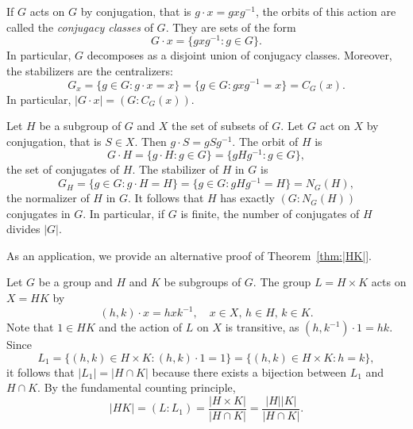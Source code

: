\begin{example}
    If $G$ acts on $G$ by conjugation, that is $g\cdot x=gxg^{-1}$, the orbits of this action are called the \emph{conjugacy classes} 
    of $G$. They are sets of the form
        \[
        G\cdot x=\{gxg^{-1}:g\in G\}.
        \]
    In particular, $G$ decomposes as a disjoint union of conjugacy classes. Moreover, 
    the stabilizers are the centralizers:
        \[
        G_x=\{g\in G:g\cdot x=x\}=\{g\in G:gxg^{-1}=x\}=C_G(x).
        \]
    In particular, $|G\cdot x|=(G:C_G(x))$.
\end{example}

\begin{example}
    Let $H$ be a subgroup of $G$ and $X$ the set of subsets of $G$. Let $G$ act on 
    $X$ by conjugation, that is $S\in X$. Then
        $g\cdot S=gSg^{-1}$. The orbit of $H$ 
        is 
        \[
        G\cdot H=\{g\cdot H:g\in G\}=\{gHg^{-1}:g\in G\},
        \]
        the set of conjugates of $H$. The stabilizer of $H$ in $G$ 
        is 
        \[
        G_H=\{g\in G:g\cdot H=H\}=\{g\in G:gHg^{-1}=H\}=N_G(H),
        \]
        the normalizer of $H$ in $G$. It follows that
        $H$ has exactly $(G:N_G(H))$ conjugates in $G$. In particular,
        if $G$ is finite, 
        the number of conjugates of $H$ divides $|G|$. 
\end{example}

As an application, we provide an alternative proof
of Theorem~\ref{thm:|HK|}. 

\begin{example}
\label{exa:for_HK}
Let $G$ be a group and $H$ and $K$ be subgroups of $G$. 
The group $L=H\times K$ acts on $X=HK$ by 
\[
(h,k)\cdot x=hxk^{-1},\quad x\in X,\,h\in H,\,k\in K.
\]
Note that $1\in HK$ and the action of $L$ on $X$ is transitive, as 
$(h,k^{-1})\cdot 1 = hk$. Since 
\[
L_1=\{(h,k)\in H\times K: (h,k)\cdot 1=1\}=\{(h,k)\in H\times K:h=k\},
\]
it follows that $|L_1|=|H\cap K|$ because there exists a bijection
between $L_1$ and 
$H\cap K$. By the fundamental counting principle, 
\[
|HK|=(L:L_1)=\frac{|H\times K|}{|H\cap K|}=\frac{|H||K|}{|H\cap K|}.
\]
\end{example}
